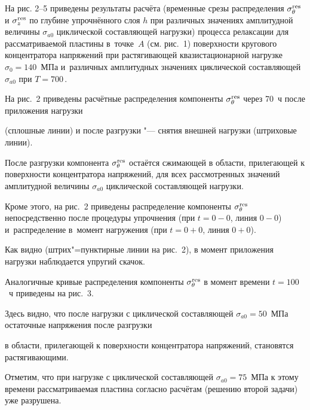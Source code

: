 На рис. 2--5 приведены результаты расчёта (временные срезы распределения $\sigma^{\rm res}_{\theta}$ и $\sigma^{\rm res}_{z}$  по глубине упрочнённого слоя $h$ при различных значениях амплитудной величины $\sigma_{a0}$ циклической составляющей нагрузки) процесса релаксации для рассматриваемой пластины в~точке~$A$ (см. рис.~1) поверхности кругового концентратора напряжений при растягивающей квазистационарной нагрузке $\sigma_0=140$~МПа и~различных амплитудных значениях циклической составляющей $\sigma_{a0}$  при $T=700$\,\textcelsius.









На рис.~2 приведены расчётные распределения компоненты $\sigma^{\rm res}_{\theta}$ через 70~ч после приложения нагрузки 

(сплошные линии) и после разгрузки "--- снятия внешней нагрузки (штриховые линии). 

После разгрузки  компонента $\sigma_{\theta}^{\rm res}$ остаётся сжимающей в области, прилегающей к поверхности концентратора напряжений, для всех рассмотренных значений амплитудной величины $\sigma_{a0}$ циклической составляющей нагрузки.

Кроме этого, на рис.~2 приведены распределение компоненты $\sigma_{\theta}^{\rm res}$ непосредственно после процедуры упрочнения (при $t=0-0$, линия $0{-}0$) и~распределение в~момент нагружения (при $t=0+0$, линия $0{+}0$). 

Как видно (штрих"=пунктирные линии на рис.~2), в момент приложения нагрузки наблюдается упругий скачок.



Аналогичные кривые распределения компоненты $\sigma_{\theta}^{\rm res}$ в момент времени $t=100$~ч приведены на рис.~3. 

Здесь видно, что после нагрузки с циклической составляющей $\sigma_{a0}=50$~МПа остаточные напряжения после разгрузки 

в области, прилегающей к поверхности концентратора напряжений, становятся растягивающими. 

Отметим, что при нагрузке с циклической составляющей $\sigma_{a0}=75$~МПа к этому времени рассматриваемая пластина согласно расчётам (решению второй задачи) уже разрушена. 





